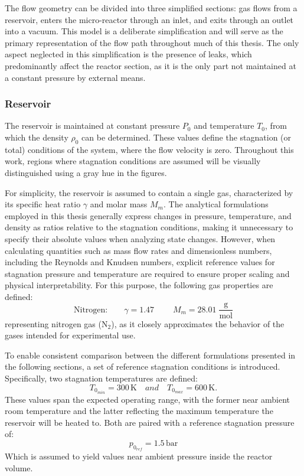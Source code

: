 The flow geometry can be divided into three simplified sections: gas flows from a reservoir, enters the micro-reactor through an inlet, and exits through an outlet into a vacuum.
This model is a deliberate simplification and will serve as the primary representation of the flow path throughout much of this thesis.
The only aspect neglected in this simplification is the presence of leaks, which predominantly affect the reactor section, as it is the only part not maintained at a constant pressure by external means.

\subsubsection*{Reservoir}
	The reservoir is maintained at constant pressure $P_0$ and temperature $T_0$, from which the density $\rho_0$ can be determined.
	These values define the stagnation (or total) conditions of the system, where the flow velocity is zero.
	Throughout this work, regions where stagnation conditions are assumed will be visually distinguished using a gray hue in the figures.

	For simplicity, the reservoir is assumed to contain a single gas, characterized by its specific heat ratio $\gamma$ and molar mass $M_m$.
	The analytical formulations employed in this thesis generally express changes in pressure, temperature, and density as ratios relative to the stagnation conditions, making it unnecessary to specify their absolute values when analyzing state changes.
	However, when calculating quantities such as mass flow rates and dimensionless numbers, including the Reynolds and Knudsen numbers, explicit reference values for stagnation pressure and temperature are required to ensure proper scaling and physical interpretability.
	For this purpose, the following gas properties are defined:
	$$
		\text{Nitrogen:} \qquad \gamma = 1.47\; \qquad M_m = 28.01\; \frac{\text{g}}{\text{mol}}
	$$
	representing nitrogen gas ($\text{N}_2$), as it closely approximates the behavior of the gases intended for experimental use.

	To enable consistent comparison between the different formulations presented in the following sections, a set of reference stagnation conditions is introduced.
	Specifically, two stagnation temperatures are defined:
	$$
		T_{0_{min}} = 300\,\text{K}
			\quad and \quad
		T_{0_{max}} = 600\,\text{K}.
	$$
	These values span the expected operating range, with the former near ambient room temperature and the latter reflecting the maximum temperature the reservoir will be heated to.
	Both are paired with a reference stagnation pressure of:
	$$
		p_{0_{ref}} = 1.5\,\text{bar}
	$$
	Which is assumed to yield values near ambient pressure inside the reactor volume.


